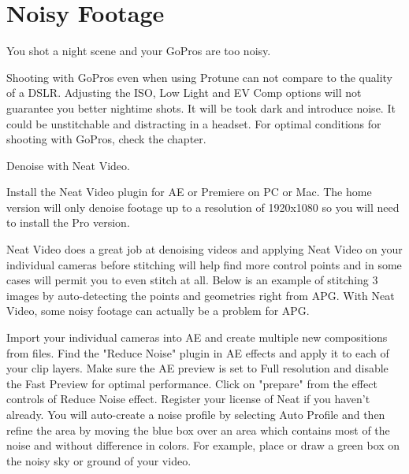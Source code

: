 \section{Noisy Footage}
\pagecolor{white}
\label{chap:55}
\begin{fullwidth}

\problem

{\large You shot a night scene and your GoPros are too noisy. \par}

Shooting with GoPros even when using Protune can not compare to the quality of a DSLR. Adjusting the ISO, Low Light and EV Comp options will not guarantee you better nightime shots. It will be took dark and introduce noise. It could be unstitchable and distracting in a headset. For optimal conditions for shooting with GoPros, check the \textbf{} chapter.

\solutions

{\large Denoise with Neat Video. \par}

Install the Neat Video plugin for AE or Premiere on PC or Mac. The home version will only denoise footage up to a resolution of 1920x1080 so you will need to install the Pro version. 

Neat Video does a great job at denoising videos and applying Neat Video on your individual cameras before stitching will help find more control points and in some cases will permit you to even stitch at all. Below is an example of stitching 3 images by auto-detecting the points and geometries right from APG. With Neat Video, some noisy footage can actually be a problem for APG.


Import your individual cameras into AE and create multiple new compositions from files. Find the "Reduce Noise" plugin in AE effects and apply it to each of your clip layers. Make sure the AE preview is set to Full resolution and disable the Fast Preview for optimal performance. Click on "prepare" from the effect controls of Reduce Noise effect. Register your license of Neat if you haven't already. You will auto-create a noise profile by selecting Auto Profile and then refine the area by moving the blue box over an area which contains most of the noise and without difference in colors. For example, place or draw a green box on the noisy sky or ground of your video.  



\end{fullwidth}
